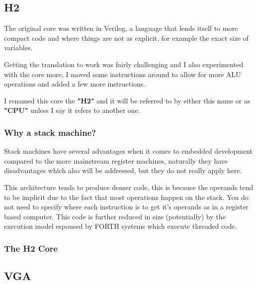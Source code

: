 \documentclass	[a4paper, 10pt]	{article}
\begin{document}
    \subsection{H2}

    The original core was written in Verilog, a language that lends itself to more
    compact code and where things are not as explicit, for example the exact size of
    variables.

    Getting the translation to work was fairly challenging and I also experimented with
    the core more, I moved some instructions around to allow for more ALU operations
    and added a few more instructions.

    I renamed this core the \textbf{"H2"} and it will be referred to by either this name
    or as \textbf{"CPU"} unless I say it refers to another one.

    \subsubsection{Why a stack machine?}

    Stack machines have several advantages when it comes to embedded development compared
    to the more mainstream register machines, naturally they have disadvantages which also
    will be addressed, but they do not really apply here.

    This architecture tends to produce denser code\cite{newwave}, this is because the operands 
    tend to
    be implicit due to the fact that most operations happen on the stack. You do not need
    to specify where each instruction is to get it's operands as in a register based
    computer. This code is further reduced in size (potentially) by the execution model
    espoused by FORTH systems which execute threaded code.



    \subsubsection{The H2 Core}


    \subsection{VGA}
\end{document}
